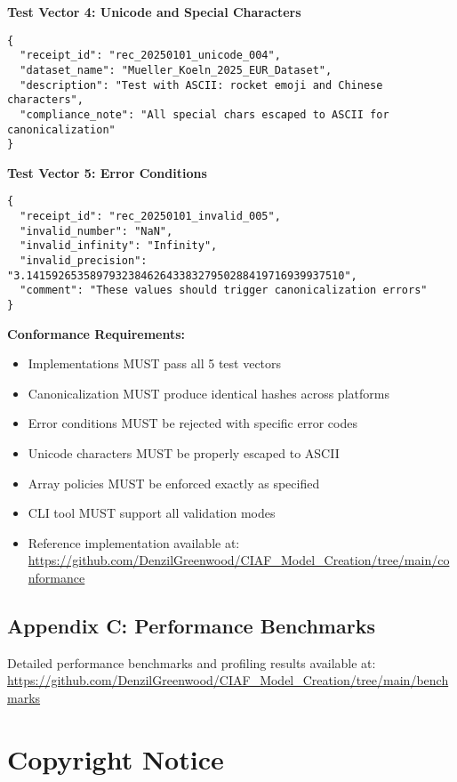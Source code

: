 \documentclass[12pt,a4paper]{article}
\begin{document}
\textbf{Test Vector 4: Unicode and Special Characters}
\begin{lstlisting}[caption=Unicode Handling Test]
{
  "receipt_id": "rec_20250101_unicode_004",
  "dataset_name": "Mueller_Koeln_2025_EUR_Dataset",
  "description": "Test with ASCII: rocket emoji and Chinese characters",
  "compliance_note": "All special chars escaped to ASCII for canonicalization"
}
\end{lstlisting}

\textbf{Test Vector 5: Error Conditions}
\begin{lstlisting}[caption=Invalid Input (Should Fail)]
{
  "receipt_id": "rec_20250101_invalid_005",
  "invalid_number": "NaN",
  "invalid_infinity": "Infinity", 
  "invalid_precision": "3.14159265358979323846264338327950288419716939937510",
  "comment": "These values should trigger canonicalization errors"
}
\end{lstlisting}

\textbf{Conformance Requirements:}
\begin{itemize}
\item Implementations MUST pass all 5 test vectors
\item Canonicalization MUST produce identical hashes across platforms
\item Error conditions MUST be rejected with specific error codes
\item Unicode characters MUST be properly escaped to ASCII
\item Array policies MUST be enforced exactly as specified
\item CLI tool MUST support all validation modes
\item Reference implementation available at: \url{https://github.com/DenzilGreenwood/CIAF_Model_Creation/tree/main/conformance}
\end{itemize}

\subsection*{Appendix C: Performance Benchmarks}

Detailed performance benchmarks and profiling results available at: \\
\url{https://github.com/DenzilGreenwood/CIAF_Model_Creation/tree/main/benchmarks}

\section*{Copyright Notice}
\end{document}

